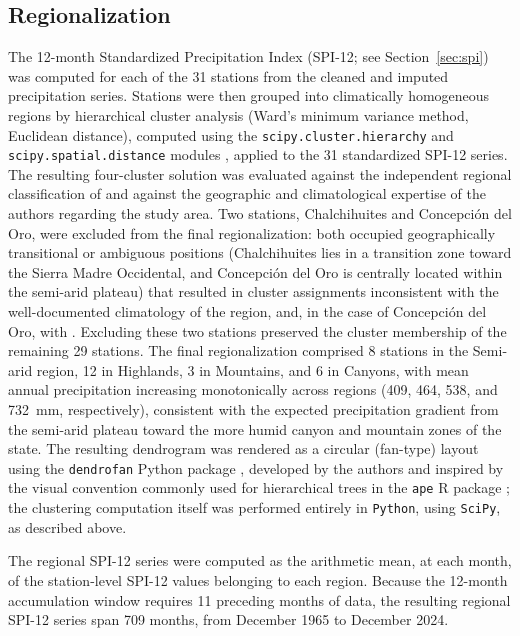 \documentclass[climate,article,submit,moreauthors]{Definitions/mdpi}
\begin{document}
\subsection{Regionalization}
\label{sec:methods-regionalization}

The 12-month Standardized Precipitation Index (SPI-12; see
Section~\ref{sec:spi})
was computed for each of the 31 stations from the cleaned and imputed
precipitation series. Stations were then grouped into climatically
homogeneous regions by hierarchical cluster analysis (Ward's minimum
variance method, Euclidean distance), computed using the
\texttt{scipy.cluster.hierarchy} and \texttt{scipy.spatial.distance} modules
\cite{Virtanen2020}, applied to the 31 standardized SPI-12 series. The
resulting four-cluster solution was evaluated against the independent
regional classification of \cite{magallanes2019} and against
the geographic and climatological expertise of the authors regarding the
study area. Two stations, Chalchihuites and Concepci\'on del Oro, were
excluded from the final regionalization: both occupied geographically
transitional or ambiguous positions (Chalchihuites lies in a transition zone
toward the Sierra Madre Occidental, and Concepci\'on del Oro is centrally
located within the semi-arid plateau) that resulted in cluster assignments
inconsistent with the well-documented climatology of the region, and, in the
case of Concepci\'on del Oro, with \cite{magallanes2019}.
Excluding these two stations preserved the cluster membership of the
remaining 29 stations. The final regionalization comprised 8 stations in the
Semi-arid region, 12 in Highlands, 3 in Mountains, and 6 in Canyons, with
mean annual precipitation increasing monotonically across regions (409, 464,
538, and 732~mm, respectively), consistent with the expected precipitation
gradient from the semi-arid plateau toward the more humid canyon and
mountain zones of the state. The resulting dendrogram was rendered as a
circular (fan-type) layout using the \texttt{dendrofan} Python package
\cite{MagallanesQuintanar2026Dendrofan}, developed by the authors and
inspired by the visual convention commonly used for hierarchical trees in
the \texttt{ape} R package \cite{Paradis2019}; the clustering computation
itself was performed entirely in \texttt{Python}, using \texttt{SciPy}, as
described above.

The regional SPI-12 series were computed as the arithmetic mean, at each
month, of the station-level SPI-12 values belonging to each region. Because
the 12-month accumulation window requires 11 preceding months of data, the
resulting regional SPI-12 series span 709 months, from December 1965 to
December 2024.
\end{document}
